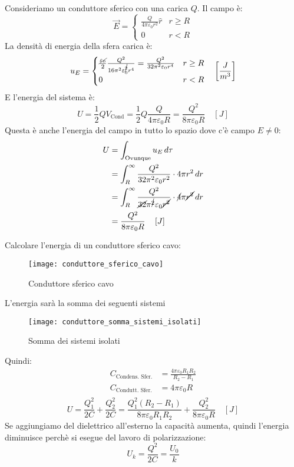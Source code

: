 \documentclass[a4paper]{article}
\begin{document}
\begin{example}
  Consideriamo un conduttore sferico con una carica \( Q \). Il campo è:
  \[
    \vec{E} =
    \begin{cases}
      \frac{Q}{4 \pi \varepsilon_0 r^2} \hat{r} & r \ge R\\
      0 & r < R
    \end{cases}
  \] 
  La densità di energia della sfera carica è:
  \[
    u_E = 
    \begin{cases}
      \frac{\cancel{\varepsilon_0}}{2} \frac{Q^2}{16 \pi^2 \varepsilon_0^{\cancel{2}} r^4}
      = \frac{Q^2}{32 \pi ^2 \varepsilon _0 r^4} & r \ge R\\
      0 & r < R
    \end{cases}
    \quad \left[ \frac{J}{m^3} \right]
  \] 
  E l'energia del sistema è:
  \[
    U = \frac{1}{2} QV_{\text{Cond}} = \frac{1}{2} Q \frac{Q}{4 \pi \varepsilon_0 R}
    = \frac{Q^2}{8 \pi \varepsilon_0 R} \quad [J]
  \] 
  Questa è anche l'energia del campo in tutto lo spazio dove c'è campo \( E \neq 0 \):
  \[
    \begin{aligned}
      U &= \int_{\text{Ovunque}} u_E \, d\tau\\
      &= \int_R^\infty \frac{Q^2}{32 \pi^2 \varepsilon_0 r^2} \cdot 4 \pi r^2 \, dr \\
      &= \int_R^\infty \frac{Q^2}{\cancel{32} \pi^{\cancel{2}} \varepsilon_0 \cancel{r^2}}
      \cdot \cancel{4} \pi \cancel{r^2} \, dr \\
      &= \frac{Q^2}{8 \pi \varepsilon_0 R} \quad \left[ J \right]
    \end{aligned}
  \] 
\end{example}

\begin{exercise}
  Calcolare l'energia di un conduttore sferico cavo:
  \begin{figure}[H]
    \centering
    \texttt{[image: conduttore\_sferico\_cavo]}
    \caption{Conduttore sferico cavo}
  \end{figure}
  \noindent
  L'energia sarà la somma dei seguenti sistemi
  \begin{figure}[H]
    \centering
    \texttt{[image: conduttore\_somma\_sistemi\_isolati]}
    \caption{Somma dei sistemi isolati}
  \end{figure}
  \noindent
  Quindi:
  \[
    \begin{aligned}
      C_{\text{Condens. Sfer.}} &= \frac{4 \pi \varepsilon_0 R_1 R_2}{R_2 - R_1}\\
      C_{\text{Condutt. Sfer.}} &= 4 \pi \varepsilon_0 R\\
    \end{aligned}
  \] 
  \[
    U = \frac{Q^2_1}{2C} + \frac{Q^2_2}{2C} = \frac{Q^2_1 (R_2 - R_1)}{8 \pi \varepsilon_0 R_1 R_2}
    + \frac{Q^2_2}{8 \pi \varepsilon_0 R} \quad [J]
  \] 
  Se aggiungiamo del dielettrico all'esterno la capacità aumenta, quindi l'energia diminuisce
  perchè si esegue del lavoro di polarizzazione:
  \[
    U_k = \frac{Q^2}{2C} = \frac{U_0}{k}
  \] 
\end{exercise}
\end{document}
